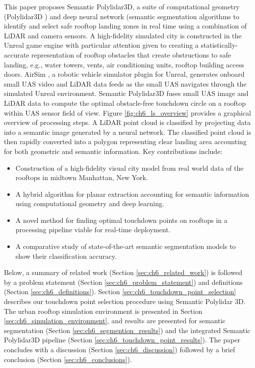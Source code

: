 This paper proposes Semantic Polylidar3D, a suite of computational geometry (Polylidar3D \cite{castagno_polylidar3d_2020}) and deep neural network (semantic segmentation  \cite{howard_mobilenets_2017, ronneberger_u-net_2015} algorithms to identify and select safe rooftop landing zones in real time using a combination of LiDAR and camera sensors.  A high-fidelity simulated city is constructed in the Unreal game engine \cite{unrealengine} with particular attention given to creating a statistically-accurate representation of rooftop obstacles that create obstructions to safe landing, e.g., water towers, vents, air conditioning units, rooftop building access doors.    AirSim \cite{shah_airsim_2018}, a robotic vehicle simulator plugin for Unreal, generates onboard small UAS video and LiDAR data feeds as the small UAS navigates through the simulated Unreal environment.  Semantic Polylidar3D fuses small UAS image and LiDAR data to compute the optimal obstacle-free touchdown circle on a rooftop within UAS sensor field of view. Figure \ref{fig:ch6_ls_overview} provides a graphical overview of processing steps. A LiDAR point cloud is classified by projecting data into a semantic image generated by a neural network. The classified point cloud is then rapidly converted into a polygon representing clear landing area accounting for both geometric and semantic information. Key contributions include:

\begin{itemize}
  \item Construction of a high-fidelity visual city model from real world data of the rooftops in midtown Manhattan, New York.
  \item A hybrid algorithm for planar extraction accounting for semantic information using computational geometry and deep learning.
  \item A novel method for finding optimal touchdown points on rooftops in a processing pipeline viable for real-time deployment. 
  \item A comparative study of state-of-the-art semantic segmentation models to show their classification accuracy.
\end{itemize}

Below, a summary of related work (Section \ref{sec:ch6_related_work}) is followed by a problem statement (Section \ref{sec:ch6_problem_statement}) and definitions (Section \ref{sec:ch6_definitions}).  Section \ref{sec:ch6_touchdown_point_selection} describes our touchdown point selection procedure using Semantic Polylidar 3D.  The urban rooftop simulation environment is presented in Section \ref{sec:ch6_simulation_environment}, and results are presented for semantic segmentation (Section \ref{sec:ch6_segmention_results}) and the integrated Semantic Polylidar3D pipeline (Section \ref{sec:ch6_touchdown_point_results}).  The paper concludes with a discussion (Section \ref{sec:ch6_discussion}) followed by a brief conclusion (Section \ref{sec:ch6_conclusions}).

